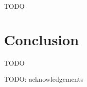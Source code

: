\documentclass[sigplan]{acmart}
\begin{document}
TODO

\section{Conclusion}

TODO

\begin{acks}
TODO: acknowledgements
\end{acks}




\appendix
\end{document}
